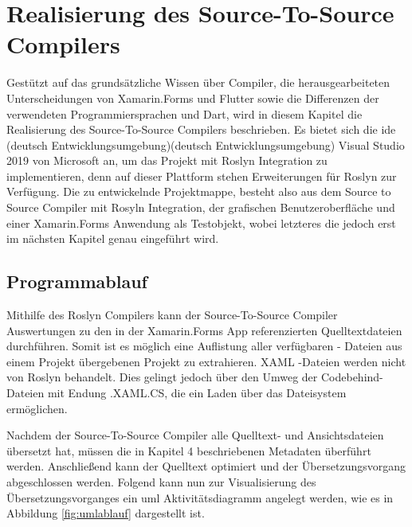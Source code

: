 \chapter{Realisierung des Source-To-Source Compilers}
\label{chap:Realisierung}
Gestützt auf das grundsätzliche Wissen über Compiler, die herausgearbeiteten Unterscheidungen von  Xamarin.Forms und Flutter sowie die Differenzen der verwendeten Programmiersprachen  \Csharp und Dart, wird in diesem Kapitel die Realisierung des Source-To-Source Compilers beschrieben.  Es bietet sich die \ac{ide} (deutsch Entwicklungsumgebung)(deutsch Entwicklungsumgebung) Visual Studio 2019 von Microsoft an,  um das Projekt mit Roslyn Integration zu implementieren,  denn auf dieser Plattform stehen Erweiterungen für Roslyn zur Verfügung.
Die zu entwickelnde Projektmappe,  besteht also aus dem Source to Source Compiler mit Rosyln Integration, der grafischen Benutzeroberfläche und einer Xamarin.Forms
Anwendung als Testobjekt,  wobei letzteres die jedoch erst im nächsten Kapitel genau eingeführt wird.


\section{Programmablauf}
Mithilfe des Roslyn Compilers kann der Source-To-Source Compiler Auswertungen zu den in der Xamarin.Forms App referenzierten Quelltextdateien durchführen.  Somit ist es
möglich eine Auflistung aller verfügbaren \Csharp - Dateien aus einem Projekt übergebenen Projekt zu extrahieren.  XAML -Dateien werden nicht von Roslyn behandelt.  Dies gelingt jedoch über den Umweg der Codebehind-Dateien mit Endung .XAML.CS,  die ein Laden über das Dateisystem ermöglichen. 

Nachdem der Source-To-Source Compiler alle Quelltext- und Ansichtsdateien übersetzt hat,  müssen die in Kapitel 4 beschriebenen Metadaten überführt werden.  Anschließend kann der Quelltext optimiert und der Übersetzungsvorgang abgeschlossen werden.  Folgend kann nun zur Visualisierung des Übersetzungsvorganges ein \ac{uml}  Aktivitätsdiagramm angelegt werden, wie es in Abbildung \ref{fig:umlablauf} dargestellt ist.

